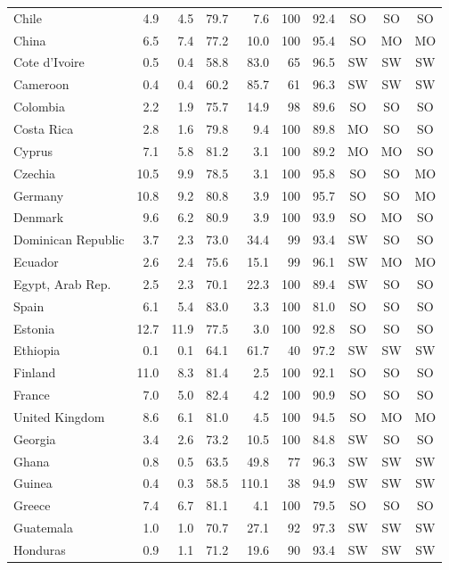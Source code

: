 \begin{longtable}{@{}lrrrrrrccc@{}}
Chile & 4.9 & 4.5 & 79.7 & 7.6 & 100 & 92.4 & SO & SO & SO \\
China & 6.5 & 7.4 & 77.2 & 10.0 & 100 & 95.4 & SO & MO & MO \\
Cote d'Ivoire & 0.5 & 0.4 & 58.8 & 83.0 & 65 & 96.5 & SW & SW & SW \\
Cameroon & 0.4 & 0.4 & 60.2 & 85.7 & 61 & 96.3 & SW & SW & SW \\
Colombia & 2.2 & 1.9 & 75.7 & 14.9 & 98 & 89.6 & SO & SO & SO \\
Costa Rica & 2.8 & 1.6 & 79.8 & 9.4 & 100 & 89.8 & MO & SO & SO \\
Cyprus & 7.1 & 5.8 & 81.2 & 3.1 & 100 & 89.2 & MO & MO & SO \\
Czechia & 10.5 & 9.9 & 78.5 & 3.1 & 100 & 95.8 & SO & SO & MO \\
Germany & 10.8 & 9.2 & 80.8 & 3.9 & 100 & 95.7 & SO & SO & MO \\
Denmark & 9.6 & 6.2 & 80.9 & 3.9 & 100 & 93.9 & SO & MO & SO \\
Dominican Republic & 3.7 & 2.3 & 73.0 & 34.4 & 99 & 93.4 & SW & SO & SO \\
Ecuador & 2.6 & 2.4 & 75.6 & 15.1 & 99 & 96.1 & SW & MO & MO \\
Egypt, Arab Rep. & 2.5 & 2.3 & 70.1 & 22.3 & 100 & 89.4 & SW & SO & SO \\
Spain & 6.1 & 5.4 & 83.0 & 3.3 & 100 & 81.0 & SO & SO & SO \\
Estonia & 12.7 & 11.9 & 77.5 & 3.0 & 100 & 92.8 & SO & SO & SO \\
Ethiopia & 0.1 & 0.1 & 64.1 & 61.7 & 40 & 97.2 & SW & SW & SW \\
Finland & 11.0 & 8.3 & 81.4 & 2.5 & 100 & 92.1 & SO & SO & SO \\
France & 7.0 & 5.0 & 82.4 & 4.2 & 100 & 90.9 & SO & SO & SO \\
United Kingdom & 8.6 & 6.1 & 81.0 & 4.5 & 100 & 94.5 & SO & MO & MO \\
Georgia & 3.4 & 2.6 & 73.2 & 10.5 & 100 & 84.8 & SW & SO & SO \\
Ghana & 0.8 & 0.5 & 63.5 & 49.8 & 77 & 96.3 & SW & SW & SW \\
Guinea & 0.4 & 0.3 & 58.5 & 110.1 & 38 & 94.9 & SW & SW & SW \\
Greece & 7.4 & 6.7 & 81.1 & 4.1 & 100 & 79.5 & SO & SO & SO \\
Guatemala & 1.0 & 1.0 & 70.7 & 27.1 & 92 & 97.3 & SW & SW & SW \\
Honduras & 0.9 & 1.1 & 71.2 & 19.6 & 90 & 93.4 & SW & SW & SW \\

\end{longtable}

